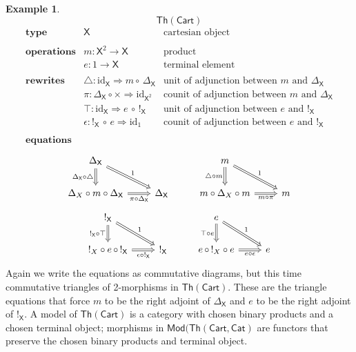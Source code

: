 \documentclass{amsart}
\theoremstyle{definition}
\newtheorem{example}[theorem]{Example}
\newcommand{\Th}{\mathsf{Th}}
\newcommand{\Cat}{\mathsf{Cat}}
\newcommand{\Mod}{\mathsf{Mod}}
\newcommand{\X}{\mathsf{X}}
\newcommand{\maps}{\colon}
\begin{document}
\begin{example}
  \[ \Th(\mathsf{Cart}) \]
  \[\begin{array}{lllllll}
      \textbf{type} &
        \X & \text{cartesian object}\\ \\
      \textbf{operations}  &
      m \maps \X^2 \to \X & \text{product} \\ 
        &  e \maps 1 \to \X & \text{terminal element} \\ \\
  \textbf{rewrites}  &
\bigtriangleup\maps \mathrm{id}_\X \Longrightarrow m \circ\, \Delta_\X & \text{unit of adjunction between $m$ and $\Delta_\X$} 
\\
&
\pi\maps \Delta_\X \circ \times \Longrightarrow \mathrm{id}_{\X^2} & \text{counit of adjunction between $m$ and $\Delta_\X$} 
\\
& \top\maps \mathrm{id}_\X \Longrightarrow e \,\circ\, !_\X & \text{unit of adjunction between $e$ and $!_\X$} \\
& \epsilon \maps !_\X \, \circ \, e \Longrightarrow \mathrm{id}_{1} & \text{counit of adjunction between $e$ and $!_\X$} \\\\
 \textbf{equations}  
 \end{array}\]
\[\begin{tikzcd}
\Delta_\X \ar[Rightarrow,d,"\Delta_\X \circ \bigtriangleup",swap,""name=b1] \ar[Rightarrow,dr,"1"]
& &   
m \ar[Rightarrow,d,"\bigtriangleup \circ m",swap,""name=b1] \ar[Rightarrow,dr,"1"]  \\
         \Delta_X \circ m \circ \Delta_\X \ar[Rightarrow,r,"\pi \circ \Delta_\X",swap] & \Delta_\X & 
         m \circ \Delta_X \circ m \ar[Rightarrow,r,"m \circ \pi",swap] & m
        \end{tikzcd}\]
\[\begin{tikzcd}
!_\X \ar[Rightarrow,d,"!_\X \circ \top",swap,""name=b1] \ar[Rightarrow,dr,"1"]
& &   
e \ar[Rightarrow,d,"\top \circ e",swap,""name=b1] \ar[Rightarrow,dr,"1"]  \\
         !_X \circ e \, \circ \, !_\X \ar[Rightarrow,r,"\epsilon \circ !_\X",swap] & !_\X & 
         e \, \circ \, !_X \circ e \ar[Rightarrow,r,"e \circ \epsilon",swap] & e
        \end{tikzcd}\]
Again we write the equations as commutative diagrams, but this time commutative
triangles of 2-morphisms in $\Th(\mathsf{Cart})$.  These are the triangle equations that force $m$ to be the right adjoint of $\Delta_\X$ and $e$ to be the right adjoint of $!_\X$.  A model of $\Th(\mathsf{Cart})$ is a category with chosen binary products and a chosen terminal object; morphisms in $\Mod(\Th(\mathsf{Cart},\Cat)$ are functors that preserve the chosen binary products and terminal object.


\end{example}
\end{document}
